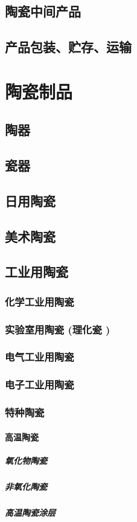 \documentclass[UTF8]{../../ApplicationUniverse}
\begin{document}
    \subsection{陶瓷中间产品}
    \subsection{产品包装、贮存、运输}
\section{陶瓷制品}
    \subsection{陶器}
    \subsection{瓷器}
    \subsection{日用陶瓷}
    \subsection{美术陶瓷}
    \subsection{工业用陶瓷}
        \subsubsection{化学工业用陶瓷}
        \subsubsection{实验室用陶瓷 (理化瓷 )}
        \subsubsection{电气工业用陶瓷}
        \subsubsection{电子工业用陶瓷}
        \subsubsection{特种陶瓷}
            \paragraph{高温陶瓷}
                \subparagraph{氧化物陶瓷}
                \subparagraph{非氧化陶瓷}
                \subparagraph{高温陶瓷涂层}
\end{document}
